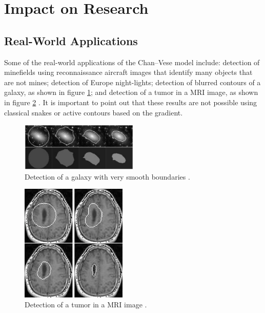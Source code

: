 \documentclass[journal]{IEEEtran}
\begin{document}
\section{Impact on Research}

\subsection{Real-World Applications}\label{sec:real-world-applications}
Some of the real-world applications of the Chan--Vese model include: detection of minefields using reconnaissance aircraft images that identify many objects that are not mines; detection of Europe night-lights; detection of blurred contours of a galaxy, as shown in figure \ref{fig:galaxy-2}; and detection of a tumor in a MRI image, as shown in figure \ref{fig:mri} \cite{ChanVese}. It is important to point out that these results are not possible using classical snakes or active contours based on the gradient.

\begin{figure}[!t]
    \centering
    \includegraphics[width=0.5\textwidth,keepaspectratio]{images/results-galaxy-2.png}
    \caption{Detection of a galaxy with very smooth boundaries \cite{ChanVese}.}
    \label{fig:galaxy-2}
\end{figure}

\begin{figure}[!t]
    \centering
    \includegraphics[height=0.275\textheight,width=0.45\textwidth]{images/results-mri.png}
    \caption{Detection of a tumor in a MRI image \cite{ChanVese}.}
    \label{fig:mri}
\end{figure}
\end{document}
